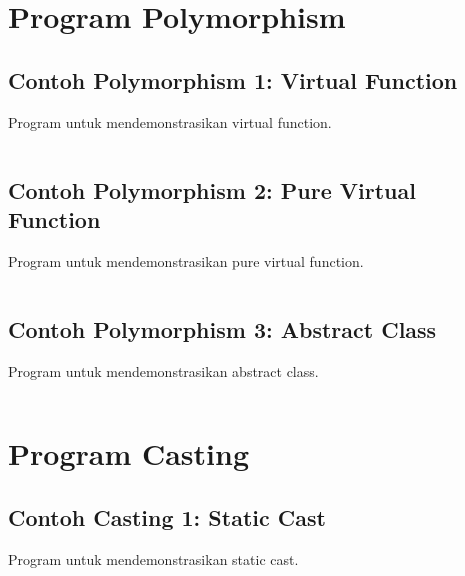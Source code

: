 \section{Program Polymorphism}

\subsection{Contoh Polymorphism 1: Virtual Function}

Program untuk mendemonstrasikan virtual function.

\begin{lstlisting}[language=c++, caption=Virtual Function]

\end{lstlisting}

\subsection{Contoh Polymorphism 2: Pure Virtual Function}

Program untuk mendemonstrasikan pure virtual function.

\begin{lstlisting}[language=c++, caption=Pure Virtual Function]

\end{lstlisting}

\subsection{Contoh Polymorphism 3: Abstract Class}

Program untuk mendemonstrasikan abstract class.

\begin{lstlisting}[language=c++, caption=Abstract Class]

\end{lstlisting}

\section{Program Casting}

\subsection{Contoh Casting 1: Static Cast}

Program untuk mendemonstrasikan static cast.

